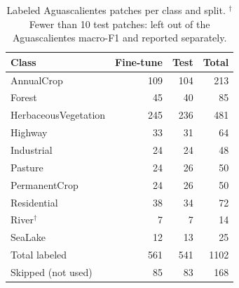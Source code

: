 \begin{table}[t]
\centering
\footnotesize
\caption{Labeled Aguascalientes patches per class and split. $^\dagger$Fewer than 10 test patches: left out of the Aguascalientes macro-F1 and reported separately.}
\label{tab:ags_classes}
\begin{tabular}{@{}lrrr@{}}
\toprule
Class & Fine-tune & Test & Total \\
\midrule
AnnualCrop & \num{109} & \num{104} & \num{213} \\
Forest & \num{45} & \num{40} & \num{85} \\
HerbaceousVegetation & \num{245} & \num{236} & \num{481} \\
Highway & \num{33} & \num{31} & \num{64} \\
Industrial & \num{24} & \num{24} & \num{48} \\
Pasture & \num{24} & \num{26} & \num{50} \\
PermanentCrop & \num{24} & \num{26} & \num{50} \\
Residential & \num{38} & \num{34} & \num{72} \\
River$^\dagger$ & \num{7} & \num{7} & \num{14} \\
SeaLake & \num{12} & \num{13} & \num{25} \\
\midrule
Total labeled & \num{561} & \num{541} & \num{1102} \\
Skipped (not used) & \num{85} & \num{83} & \num{168} \\
\bottomrule
\end{tabular}
\end{table}
